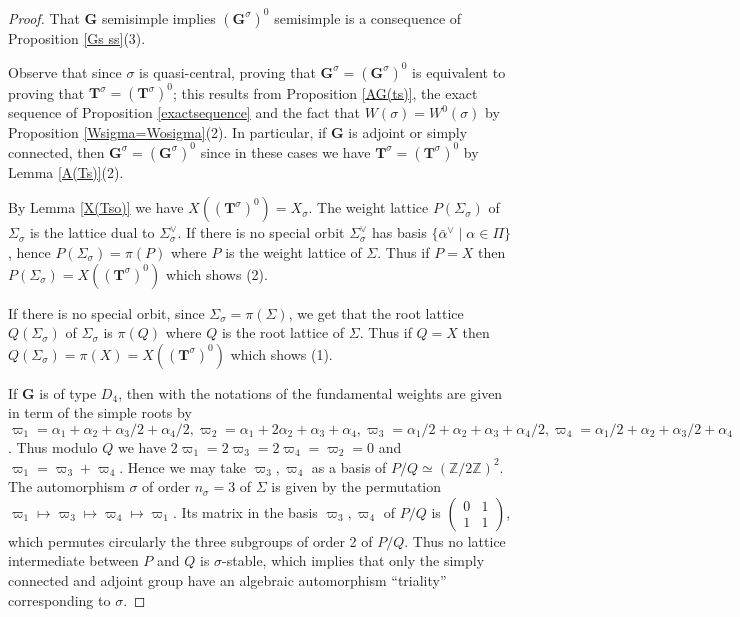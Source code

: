 \documentclass{amsart}
\numberwithin{equation}{section}
\theoremstyle{definition}
\theoremstyle{remark}
\newcommand\bG{{\mathbf G}}
\newcommand\bT{{\mathbf T}}
\newcommand\BZ{{\mathbb Z}}
\newcommand\Gs{{\bG^\sigma}}
\newcommand\Gso{{(\Gs)^0}}
\newcommand\Tso{{(\bT^\sigma)^0}}
\newcommand\Ts{{\bT^\sigma}}
\begin{document}
\begin{proof}  
That $\bG$ semisimple implies $\Gso$ semisimple is a consequence of 
Proposition \ref{Gs ss}(3).

Observe  that  since  $\sigma$  is  quasi-central,  proving that
$\Gs=\Gso$  is  equivalent  to  proving  that  $\Ts=\Tso$; this results from
Proposition
\ref{AG(ts)}, the exact sequence of Proposition \ref{exactsequence} and
the fact that $W(\sigma)=W^0(\sigma)$ by Proposition \ref{Wsigma=Wosigma}(2). In
particular,  if  $\bG$  is  adjoint  or  simply connected, then $\Gs=\Gso$
since in these cases we have $\Ts=\Tso$ by Lemma \ref{A(Ts)}(2).

By  Lemma  \ref{X(Tso)}  we  have $X(\Tso)=X_\sigma$. The
weight lattice $P(\Sigma_\sigma)$
of $\Sigma_\sigma$ is the lattice dual to
$\Sigma_\sigma^\vee$.  If there is no special orbit $\Sigma_\sigma^\vee$
has basis $\{\bar\alpha^\vee\mid\alpha\in\Pi\}$, hence
$P(\Sigma_\sigma)=\pi(P)$ where $P$ is the weight lattice of $\Sigma$. Thus
if $P=X$ then $P(\Sigma_\sigma)=X(\Tso)$ which shows (2).

If there is no special orbit, since $\Sigma_\sigma=\pi(\Sigma)$, we get
that the  root  lattice  $Q(\Sigma_\sigma)$
of  $\Sigma_\sigma$  is
$\pi(Q)$  where $Q$ is the  root lattice of $\Sigma$. Thus
if $Q=X$ then $Q(\Sigma_\sigma)=\pi(X)=X(\Tso)$ which shows (1).

If  $\bG$  is  of  type  $D_4$,  then  with  the notations of \cite[Planche
IV]{Bou}  the fundamental weights are given in  term of the simple roots by
$\varpi_1=\alpha_1+\alpha_2+\alpha_3/2+\alpha_4/2,
\varpi_2=\alpha_1+2\alpha_2+\alpha_3+\alpha_4,
\varpi_3=\alpha_1/2+\alpha_2+\alpha_3+\alpha_4/2,
\varpi_4=\alpha_1/2+\alpha_2+\alpha_3/2+\alpha_4$.  Thus modulo $Q$ we have
$2\varpi_1=2\varpi_3=2\varpi_4=\varpi_2=0$ and
$\varpi_1=\varpi_3+\varpi_4$.  Hence we  may take  $\varpi_3,\varpi_4$ as a
basis  of $P/Q\simeq(\BZ/2\BZ)^2$. The automorphism $\sigma$ of order
$n_\sigma =3$ of
$\Sigma$  is given by  the permutation $\varpi_1\mapsto  \varpi_3 \mapsto
\varpi_4\mapsto \varpi_1$.  Its matrix in the
basis $\varpi_3,\varpi_4$ of $P/Q$ is
$\begin{pmatrix}0&1\\1&1\end{pmatrix}$, which permutes circularly the three
subgroups of order 2 of $P/Q$. Thus no lattice intermediate between $P$ and
$Q$  is $\sigma$-stable, which  implies that only  the simply connected and
adjoint  group have an algebraic automorphism ``triality'' corresponding to
$\sigma$.


\end{proof}
\end{document}
